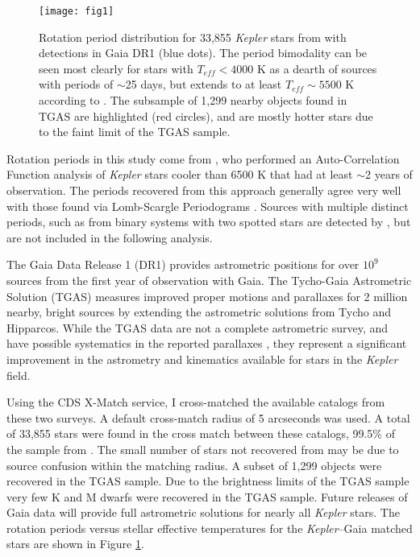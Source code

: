 \documentclass[manuscript, letterpaper]{aastex6}
\makeatletter
\let\origsection\section
\renewcommand\section{\@ifstar{\starsection}{\nostarsection}}
\newcommand\nostarsection[1]{\sectionprelude\origsection{#1}}
\newcommand\starsection[1]{\sectionprelude\origsection*{#1}}
\newcommand\sectionprelude{\vspace{1em}}
\newcommand{\Kepler}{\textsl{Kepler}\xspace}
\makeatother
\begin{document}
\begin{figure}[]
\centering
\texttt{[image: fig1]}
\caption{
Rotation period distribution for 33,855 \Kepler stars from \citet{mcquillan2014} with detections in Gaia DR1 (blue dots). The period bimodality can be seen most clearly for stars with $T_{eff} < 4000$ K as a dearth of sources with periods of $\sim$25 days, but extends to at least $T_{eff}\sim5500$ K according to \citet{mcquillan2014}. The subsample of 1,299 nearby objects found in TGAS are highlighted (red circles), and are mostly hotter stars due to the faint limit of the TGAS sample. 
}
\label{fig:all}
\end{figure}



\section{The \Kepler--Gaia Data}
Rotation periods in this study come from \citet{mcquillan2014}, who performed an Auto-Correlation Function analysis of \Kepler stars cooler than 6500 K that had at least $\sim$2 years of observation. The periods recovered from this approach generally agree very well with those found via Lomb-Scargle Periodograms \citep[e.g.][]{reinhold2013,aigrain2015}. Sources with multiple distinct periods, such as from binary systems with two spotted stars \citep[e.g.][]{lurie2015} are detected by \citet{mcquillan2014}, but are not included in the following analysis.

The Gaia Data Release 1 (DR1) provides astrometric positions for over $10^9$ sources from the first year of observation with Gaia. The Tycho-Gaia Astrometric Solution (TGAS) measures improved proper motions and parallaxes for 2 million nearby, bright sources by extending the astrometric solutions from Tycho and Hipparcos. While the TGAS data are not a complete astrometric survey, and have possible systematics in the reported parallaxes \citep{gaia_dr1,stassun2016}, they represent a significant improvement in the astrometry and kinematics available for stars in the \Kepler field.


Using the CDS X-Match service, I cross-matched the available catalogs from these two surveys. A default cross-match radius of 5 arcseconds was used. A total of 33,855 stars were found in the cross match between these catalogs, 99.5\% of the sample from \citet{mcquillan2014}. The small number of stars not recovered from \citet{mcquillan2014} may be due to source confusion within the matching radius. A subset of 1,299 objects were recovered in the TGAS sample. Due to the brightness limits of the TGAS sample very few K and M dwarfs were recovered in the TGAS sample. Future releases of Gaia data will provide full astrometric solutions for nearly all \Kepler stars. The rotation periods versus stellar effective temperatures for the \Kepler--Gaia matched stars are shown in Figure \ref{fig:all}. 
\end{document}
